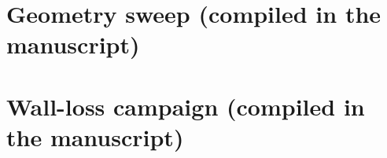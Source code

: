 \documentclass[11pt]{article}
\begin{document}
\section{Geometry sweep (compiled in the manuscript)}\label{sec:l1a-sweep-v2}
\section{Wall-loss campaign (compiled in the manuscript)}\label{sec:wall-loss-v4}

\end{document}
